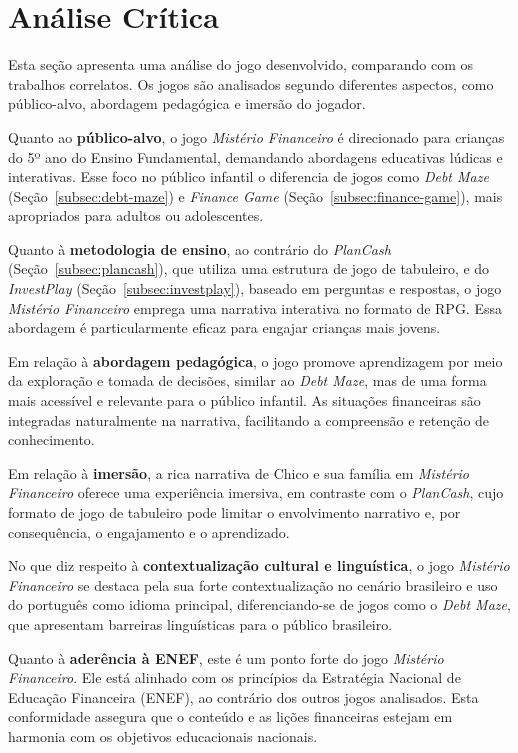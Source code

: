 \section{Análise Crítica}

Esta seção apresenta uma análise do jogo desenvolvido, comparando com os trabalhos correlatos. Os jogos são analisados segundo diferentes aspectos, como público-alvo, abordagem pedagógica e imersão do jogador.

Quanto ao \textbf{público-alvo}, o jogo \textit{Mistério Financeiro} é direcionado para crianças do 5º ano do Ensino Fundamental, demandando abordagens educativas lúdicas e interativas. Esse foco no público infantil o diferencia de jogos como \textit{Debt Maze} (Seção~\ref{subsec:debt-maze}) e \textit{Finance Game} (Seção~\ref{subsec:finance-game}), mais apropriados para adultos ou adolescentes.

Quanto à \textbf{metodologia de ensino}, ao contrário do \textit{PlanCash} (Seção~\ref{subsec:plancash}), que utiliza uma estrutura de jogo de tabuleiro, e do \textit{InvestPlay} (Seção~\ref{subsec:investplay}), baseado em perguntas e respostas, o jogo \textit{Mistério Financeiro} emprega uma narrativa interativa no formato de RPG. Essa abordagem é particularmente eficaz para engajar crianças mais jovens.

Em relação à \textbf{abordagem pedagógica}, o jogo promove aprendizagem por meio da exploração e tomada de decisões, similar ao \textit{Debt Maze}, mas de uma forma mais acessível e relevante para o público infantil. As situações financeiras são integradas naturalmente na narrativa, facilitando a compreensão e retenção de conhecimento.

Em relação à \textbf{imersão}, a rica narrativa de Chico e sua família em \textit{Mistério Financeiro} oferece uma experiência imersiva, em contraste com o \textit{PlanCash}, cujo formato de jogo de tabuleiro pode limitar o envolvimento narrativo e, por consequência, o engajamento e o aprendizado.

No que diz respeito à \textbf{contextualização cultural e linguística}, o jogo \textit{Mistério Financeiro} se destaca pela sua forte contextualização no cenário brasileiro e uso do português como idioma principal, diferenciando-se de jogos como o \textit{Debt Maze}, que apresentam barreiras linguísticas para o público brasileiro.

Quanto à \textbf{aderência à ENEF}, este é um ponto forte do jogo \textit{Mistério Financeiro}. Ele está alinhado com os princípios da Estratégia Nacional de Educação Financeira (ENEF), ao contrário dos outros jogos analisados. Esta conformidade assegura que o conteúdo e as lições financeiras estejam em harmonia com os objetivos educacionais nacionais.

